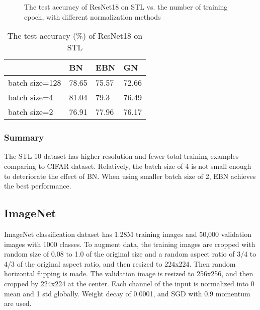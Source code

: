 \documentclass[runningheads]{llncs}
\begin{document}
\begin{figure}[!htb]
\centering
{}
\centering
{}
\centering
{}
\caption{The test accuracy of ResNet18 on STL vs. the number of training epoch, with different normalization methods}
\label{fig_stl}
\end{figure}

\begin{table}[!htb]
\caption{The test accuracy (\%) of ResNet18 on STL}
\label{tab_stl}
\centering
\begin{tabular}{l|lll}
\hline
  & BN & EBN & GN \\
\hline
batch size=128     & 78.65  & 	75.57 & 72.66     \\
batch size=4       & 81.04  & 79.3 & 76.49     \\
batch size=2       & 76.91  & 77.96 & 76.17     \\
\hline
\end{tabular}
\end{table}

\subsubsection{Summary}  The STL-10 dataset has higher resolution and fewer total training examples comparing to CIFAR dataset. Relatively, the batch size of 4 is not small enough to deteriorate the effect of BN.
When using smaller batch size of 2, EBN achieves the best performance. 

\subsection{ImageNet}


ImageNet classification dataset \cite{russakovsky2015imagenet} has 1.28M training images and 50,000 validation images with 1000 classes.  To augment data, the training images are cropped with random size of 0.08 to 1.0 of the original size and a random aspect ratio of 3/4 to 4/3 of the original aspect ratio,  and then resized to 224x224. Then random horizontal flipping is made. The validation image is resized to 256x256,  and then cropped by 224x224 at the center. Each channel of the input is normalized into 0 mean and 1 std globally.
Weight decay of 0.0001, and SGD with 0.9 momentum are used. 
\end{document}
